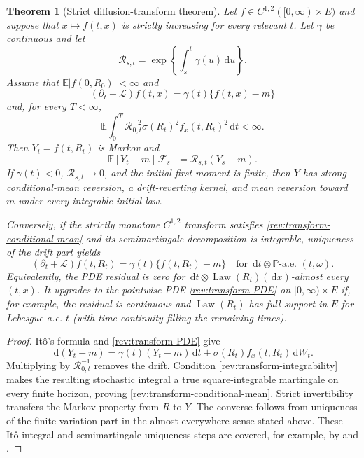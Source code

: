 \documentclass[11pt]{article}
\newtheorem{theorem}[definition]{Theorem}
\theoremstyle{remark}
\newcommand{\E}{\mathbb E}
\newcommand{\Pp}{\mathbb P}
\newcommand{\dd}{\,\mathrm d}
\newcommand{\Law}{\operatorname{Law}}
\begin{document}
\begin{theorem}[Strict diffusion-transform theorem]
\label{rev:thm-diffusion-transform}
Let $f\in C^{1,2}([0,\infty)\times E)$ and suppose that
$x\mapsto f(t,x)$ is strictly increasing for every relevant $t$.  Let
$\gamma$ be continuous and let
\begin{equation}
\mathcal R_{s,t}=\exp\!\left\{\int_s^t\gamma(u)\dd u\right\}.
\label{rev:R-gamma}
\end{equation}
Assume that $\E|f(0,R_0)|<\infty$ and
\begin{equation}
(\partial_t+\mathcal L)f(t,x)=\gamma(t)\{f(t,x)-m\}
\label{rev:transform-PDE}
\end{equation}
and, for every $T<\infty$,
\begin{equation}
\E\int_0^T \mathcal R_{0,t}^{-2}
\sigma(R_t)^2f_x(t,R_t)^2\dd t<\infty.
\label{rev:transform-integrability}
\end{equation}
Then $Y_t=f(t,R_t)$ is Markov and
\begin{equation}
\E[Y_t-m\mid\mathcal F_s]=\mathcal R_{s,t}(Y_s-m).
\label{rev:transform-conditional-mean}
\end{equation}
If $\gamma(t)<0$, $\mathcal R_{s,t}\to0$, and the initial first moment is finite,
then $Y$ has strong conditional-mean reversion, a drift-reverting kernel, and
mean reversion toward $m$ under every integrable initial law.

Conversely, if the strictly monotone $C^{1,2}$ transform satisfies
\eqref{rev:transform-conditional-mean} and its semimartingale decomposition is
integrable, uniqueness of the drift part yields
\begin{equation}
 (\partial_t+\mathcal L)f(t,R_t)
 =\gamma(t)\{f(t,R_t)-m\}
 \quad\text{for }\dd t\otimes\Pp\text{-a.e. }(t,\omega).
\label{rev:transform-PDE-law-ae}
\end{equation}
Equivalently, the PDE residual is zero for
$\dd t\otimes\Law(R_t)(\dd x)$-almost every $(t,x)$.  It upgrades to the
pointwise PDE \eqref{rev:transform-PDE} on $[0,\infty)\times E$ if, for example,
the residual is continuous and $\Law(R_t)$ has full support in $E$ for
Lebesgue-a.e. $t$ (with time continuity filling the remaining times).
\end{theorem}

\begin{proof}
It\^o's formula and \eqref{rev:transform-PDE} give
\[
\dd(Y_t-m)=\gamma(t)(Y_t-m)\dd t
+\sigma(R_t)f_x(t,R_t)\dd W_t.
\]
Multiplying by $\mathcal R_{0,t}^{-1}$ removes the drift.  Condition
\eqref{rev:transform-integrability} makes the resulting stochastic integral a
true square-integrable martingale on every finite horizon, proving
\eqref{rev:transform-conditional-mean}.  Strict invertibility transfers the
  Markov property from $R$ to $Y$.  The converse follows from uniqueness of the
  finite-variation part in the almost-everywhere sense stated above.  These It\^o-integral and semimartingale-uniqueness steps
are covered, for example, by \citet{KaratzasShreve1991} and
\citet{Protter2005}.
\end{proof}
\end{document}
